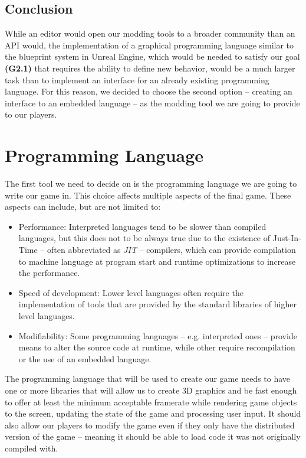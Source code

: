 \subsection{Conclusion}

While an editor would open our modding tools to a broader community than an API would, the implementation of a graphical programming
language similar to the blueprint system in Unreal Engine, which would be needed to satisfy our goal \textbf{(G2.1)} that requires
the ability to define new behavior, would be a much larger task than to implement an interface for an already
existing programming language. For this reason, we decided to choose the second option -- creating an interface to an embedded
language -- as the modding tool we are going to provide to our players.

\section{Programming Language}

The first tool we need to decide on is the programming language we are going to write our game in.
This choice affects multiple aspects of the final game. These aspects can include, but are not limited to:

\begin{itemize}
    \item Performance: Interpreted languages tend to be slower than compiled languages, but this
        does not to be always true due to the existence of Just-In-Time -- often abbreviated as \emph{JIT} -- compilers, 
        which can provide compilation
        to machine language at program start and runtime optimizations to increase the performance.
    \item Speed of development: Lower level languages often require the implementation of tools that
        are provided by the standard libraries of higher level languages.
    \item Modifiability: Some programming languages -- e.g. interpreted ones -- provide means to
        alter the source code at runtime, while other require recompilation or the use of an embedded language.
\end{itemize}

The programming language that will be used to create our game needs to have one or more libraries that will allow us
to create 3D graphics and be fast enough to offer at least the minimum acceptable framerate while rendering game objects
to the screen, updating the state of the game and processing user input. It should also allow our players to modify the game
even if they only have the distributed version of the game -- meaning it should be able to load code it was not originally compiled
with.

